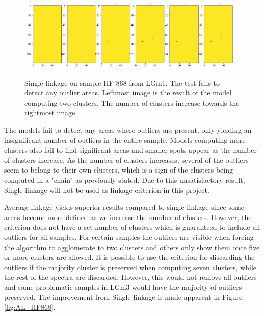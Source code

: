 \begin{figure}[H]

    \centering
{\includegraphics[width=15cm]{images/Single_linkage/LGm-1/HF-868_1_2.h5_0.png} }
\caption{Single linkage on sample HF-868 from LGm1, The test fails to detect any outlier areas. Leftmost image is the result of the model computing two clusters. The number of clusters increase towards the rightmost image.\label{fig:SL_HF868}}%

\end{figure}

The models fail to detect any areas where outliers are present, only yielding an insignificant number of outliers in the entire sample. Models computing more clusters also fail to find significant areas and smaller spots appear as the number of clusters increase. As the number of clusters increases, several of the outliers seem to belong to their own clusters, which is a sign of the clusters being computed in a "chain" as previously stated. Due to this unsatisfactory result, Single linkage will not be used as linkage criterion in this project.


Average linkage yields superior results compared to single linkage since some areas become more defined as we increase the number of clusters. However, the criterion does not have a set number of clusters which is guaranteed to include all outliers for all samples. For certain samples the outliers are visible when forcing the algorithm to agglomerate to two clusters and others only show them once five or more clusters are allowed. It is possible to use the criterion for discarding the outliers if the majority cluster is preserved when computing seven clusters, while the rest of the spectra are discarded. However, this would not remove all outliers and some problematic samples in LGm3 would have the majority of outliers preserved. The improvement from Single linkage is made apparent in Figure \ref{fig:AL_HF868}.


